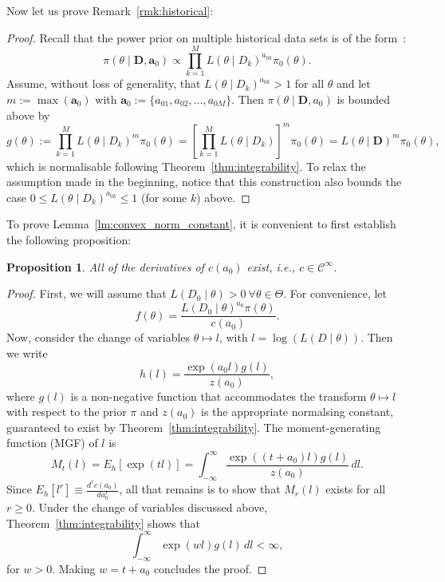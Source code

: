 \documentclass[a4paper, notitlepage, 11pt]{article}
\newtheorem{proposition}{Proposition}[]
\begin{document}
Now let us prove Remark~\ref{rmk:historical}:
\begin{proof}
 Recall that the power prior on multiple historical data sets is of the form~\citep[Eq. 2.9]{Ibrahim2015}:
 \[ \pi(\theta \mid \boldsymbol D, \boldsymbol a_0) \propto \prod_{k=1}^M L(\theta \mid D_k)^{a_{0k}} \pi_0(\theta). \]
Assume, without loss of generality, that $L(\theta \mid  D_k)^{a_{0k}} > 1$ for all $\theta$ and let $m := \max(\boldsymbol a_0)$ with $\boldsymbol a_0 := \{ a_{01}, a_{02}, \ldots, a_{0M}\}$.
Then $\pi(\theta \mid \boldsymbol D, a_0)$ is bounded above by 
\[  g(\theta) :=  \prod_{k=1}^M L(\theta \mid D_k)^{m} \pi_0(\theta) =  \left[ \prod_{k=1}^M L(\theta \mid D_k) \right]^m  \pi_0(\theta) = L(\theta \mid \boldsymbol D)^m \pi_0(\theta), \]
which is normalisable following Theorem~\ref{thm:integrability}.
To relax the assumption made in the beginning, notice that this construction also bounds the case $ 0 \leq  L(\theta \mid  D_k)^{a_{0k}} \leq 1$ (for some $k$) above.
\end{proof}

To prove Lemma~\ref{lm:convex_norm_constant}, it is convenient to first establish the following proposition:

\begin{proposition}
\label{prop:c_is_Cinfinity}
All of the derivatives of $c(a_0)$ exist, i.e., $c \in \mathcal{C}^{\infty}$.
\end{proposition}
\begin{proof}
First, we will assume that $L(D_0 \mid \theta) > 0\: \forall \theta \in \Theta$.
For convenience, let
\[  f(\theta) = \frac{L(D_0 \mid \theta)^{a_0} \pi(\theta)}{c(a_0)}. \]
Now, consider the change of variables $\theta \mapsto l$, with $l = \log(L(D \mid \theta))$.
Then we write
\[ h (l) = \frac{\exp(a_0 l) g(l)}{z(a_0)},\]
where $g(l)$ is a non-negative function that accommodates the transform $\theta \mapsto l$ with respect to the prior $\pi$ and $z(a_0)$ is the appropriate normalsing constant, guaranteed to exist by Theorem~\ref{thm:integrability}.
The moment-generating function (MGF) of $l$ is 
\[ M_t(l) = E_h[\exp(tl)] = \int_{-\infty}^\infty \frac{\exp((t + a_0) l) g(l)}{z(a_0)}\, dl.\]
Since $E_h[l^r] \equiv  \frac{d^r c(a_0)}{d a_0^r}$, all that remains is to show that $M_r(l)$ exists for all $r \geq 0$.
Under the change of variables discussed above, Theorem~\ref{thm:integrability} shows that
\[ \int_{-\infty}^\infty \exp(wl) g(l)\, dl < \infty,\]
for $w > 0$.
Making $w = t + a_0$ concludes the proof.
\end{proof}
\end{document}
